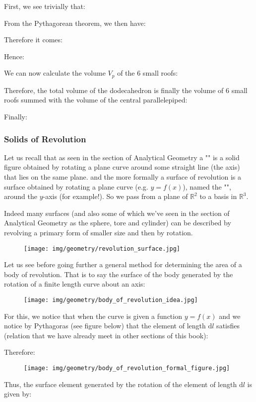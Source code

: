 {	First, we see trivially that:
	
	From the Pythagorean theorem, we then have:
	
	Therefore it comes:
	
	Hence:
	
	We can now calculate the volume $V_p$ of the $6$ small roofs:
	
	Therefore, the total volume of the dodecahedron is finally the volume of $6$ small roofs summed with the volume of the central parallelepiped:
	
	Finally:
	
	
	\subsubsection{Solids of Revolution}
	Let us recall that as seen in the section of Analytical Geometry a "" is a solid figure obtained by rotating a plane curve around some straight line (the axis) that lies on the same plane. and the more formally a surface of revolution is a surface obtained by rotating a plane curve (e.g. $y=f(x)$), named the "", around the $y$-axis (for example!). So we pass from a plane of $\mathbb{R}^2$ to a basis in $\mathbb{R}^3$.
	
	Indeed many surfaces (and also some of which we've seen in the section of Analytical Geometry as the sphere, tore and cylinder) can be described by revolving a primary form of smaller size and then by rotation.
	\begin{figure}[H]
		\centering
		\texttt{[image: img/geometry/revolution\_surface.jpg]}
	\end{figure}
	Let us see before going further a general method for determining the area of a body of revolution. That is to say the surface of the body generated by the rotation of a finite length curve about an axis:
	\begin{figure}[H]
		\centering
		\texttt{[image: img/geometry/body\_of\_revolution\_idea.jpg]}
	\end{figure}
	For this, we notice that when the curve is given a function $y=f(x) $ and we notice by Pythagoras (see figure below) that the element of length $\mathrm{d}l$ satisfies (relation that we have already meet in other sections of this book):
	
	Therefore:
	
	\begin{figure}[H]
		\centering
		\texttt{[image: img/geometry/body\_of\_revolution\_formal\_figure.jpg]}
	\end{figure}
	Thus, the surface element generated by the rotation of the element of length $\mathrm{d}l$ is given by:
	
}
